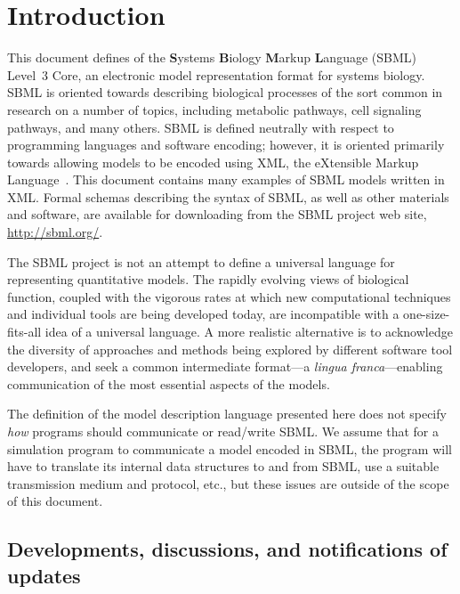 
\section{Introduction}
\label{sec:introduction}

This document defines \thisVnum of the \textbf{S}ystems
\textbf{B}iology \textbf{M}arkup \textbf{L}anguage (SBML) Level~3
Core, an electronic model representation format for systems
biology.  SBML is oriented towards describing biological processes
of the sort common in research on a number of topics, including
metabolic pathways, cell signaling pathways, and many others.
SBML is defined neutrally with respect to programming languages
and software encoding; however, it is oriented primarily towards
allowing models to be encoded using XML, the eXtensible Markup
Language~\citep{bray:2000}.  This document contains many examples
of SBML models written in XML.  Formal schemas describing the
syntax of SBML, as well as other materials and software, are
available for downloading from the SBML project web site,
\url{http://sbml.org/}.

The SBML project is not an attempt to define a universal language
for representing quantitative models.  The rapidly evolving views
of biological function, coupled with the vigorous rates at which
new computational techniques and individual tools are being
developed today, are incompatible with a one-size-fits-all idea of
a universal language. A more realistic alternative is to
acknowledge the diversity of approaches and methods being explored
by different software tool developers, and seek a common
intermediate format---a \emph{lingua franca}---enabling
communication of the most essential aspects of the models.

The definition of the model description language presented here
does not specify \emph{how} programs should communicate or
read/write SBML.  We assume that for a simulation program to
communicate a model encoded in SBML, the program will have to
translate its internal data structures to and from SBML, use a
suitable transmission medium and protocol, etc., but these issues
are outside of the scope of this document.


\subsection{Developments, discussions, and notifications of updates}

